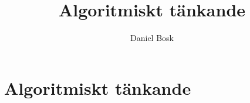 \documentclass[a4paper,10pt,oneside,openright,
               oldfontcommands]{memoir}
\begin{document}
\title{%
  Algoritmiskt tänkande
}
\author{Daniel Bosk}

\maketitle

\begin{abstract}
  
\end{abstract}

\clearpage

\tableofcontents*

\chapter{Algoritmiskt tänkande}



\appendix


\printbibliography
\end{document}
